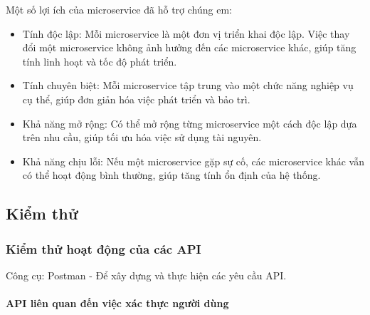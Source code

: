 Một số lợi ích của microservice đã hỗ trợ chúng em:
\begin{itemize}
	\item Tính độc lập: Mỗi microservice là một đơn vị triển khai độc lập. Việc thay đổi một microservice không ảnh hưởng đến các microservice khác, giúp tăng tính linh hoạt và tốc độ phát triển.
	\item Tính chuyên biệt: Mỗi microservice tập trung vào một chức năng nghiệp vụ cụ thể, giúp đơn giản hóa việc phát triển và bảo trì.
	\item Khả năng mở rộng: Có thể mở rộng từng microservice một cách độc lập dựa trên nhu cầu, giúp tối ưu hóa việc sử dụng tài nguyên.
	\item Khả năng chịu lỗi: Nếu một microservice gặp sự cố, các microservice khác vẫn có thể hoạt động bình thường, giúp tăng tính ổn định của hệ thống.
\end{itemize}

\subsection{Kiểm thử}

\subsubsection{Kiểm thử hoạt động của các API}




Công cụ: Postman - Để xây dựng và thực hiện các yêu cầu API.

\paragraph{API liên quan đến việc xác thực người dùng}
\mbox{}



